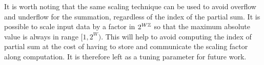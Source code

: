     It is worth noting that the same scaling technique can be used to avoid
    overflow and underflow for the summation, regardless of the index of the partial sum.
    It is possible to scale input data by a factor in $2^{W\mathbb{Z}}$ so that the maximum
    absolute value is always in range $[1,2^W)$.
    This will help to avoid computing the index of partial sum
    at the cost of having to store and communicate the scaling factor along computation.
    It is therefore left as a tuning parameter for future work.

